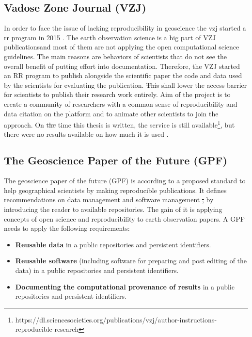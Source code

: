 \documentclass[draft,final]{vutinfth} %
\providecommand{\DIFaddtex}[1]{{\protect\color{blue}\uwave{#1}}} %
\providecommand{\DIFdeltex}[1]{{\protect\color{red}\sout{#1}}}                      %
\providecommand{\DIFaddbegin}{} %
\providecommand{\DIFaddend}{} %
\providecommand{\DIFdelbegin}{} %
\providecommand{\DIFdelend}{} %
\providecommand{\DIFadd}[1]{\texorpdfstring{\DIFaddtex{#1}}{#1}} %
\providecommand{\DIFdel}[1]{\texorpdfstring{\DIFdeltex{#1}}{}} %
\begin{document}
\subsection{Vadose Zone Journal (VZJ)}\label{VZJ}
In order to face the issue of lacking reproducibility in geoscience the \gls{vzj} started a \gls{rr} program in 2015 \cite{doi:10.2136/vzj2015.06.0088}. 
The earth observation science is a big part of VZJ publications\DIFaddbegin \DIFadd{, }\DIFaddend and most of them are not applying the open computational science guidelines. The main reasons are behaviors of scientists that do not see the overall benefit of putting effort into documentation. Therefore, the VZJ started an RR program to publish alongside the scientific paper the code and data used by the scientists for evaluating the publication. \DIFdelbegin \DIFdel{This }\DIFdelend \DIFaddbegin \DIFadd{The strategy }\DIFaddend shall lower the access barrier for scientists to publish their research work entirely. Aim of the project is to create a community of researchers with a \DIFdelbegin \DIFdel{common }\DIFdelend \DIFaddbegin \DIFadd{shared }\DIFaddend sense of reproducibility and data citation on the platform and to animate other scientists to join the approach. On \DIFdelbegin \DIFdel{the }\DIFdelend time this thesis is written, the service is still available\footnote{https://dl.sciencesocieties.org/publications/vzj/author-instructions-reproducible-research}, but there were no results available on how much it is used \cite{doi:10.2136/vzj2015.06.0088}.

\subsection{The Geoscience Paper of the Future (GPF)}\label{GPF}

The geoscience paper of the future (GPF) is according to \cite{Gil2016TowardTG} a proposed standard to help geographical scientists by making reproducible publications. It defines recommendations on data management and software management \DIFdelbegin \DIFdel{, }\DIFdelend by introducing the reader to available repositories. The gain of it is applying concepts of open science and reproducibility to earth observation papers. A GPF needs to apply the following requirements:

\begin{itemize}
	\item \textbf{Reusable data} in a public repositories and persistent identifiers.
	\item \textbf{Reusable software} (including software for preparing and post editing of the data) in a  public repositories and persistent identifiers.
	\item \textbf{Documenting the computational provenance of results} in a public repositories and persistent identifiers.  
\end{itemize}
\end{document}
